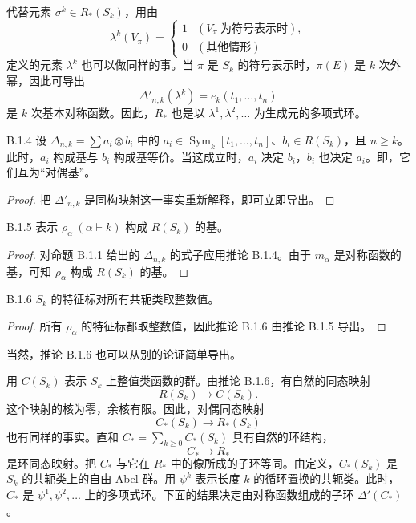 代替元素 $\sigma^k\in R_*(S_k)$，用由
\[
  \lambda^k(V_\pi)=
  \begin{cases}
    1 & (V_\pi\ \text{为符号表示时}),\\
    0 & (\text{其他情形})
  \end{cases}
\]
定义的元素 $\lambda^k$ 也可以做同样的事。当 $\pi$ 是 $S_k$ 的符号表示时，$\pi(E)$ 是 $k$ 次外幂，因此可导出
\[
  \Delta'_{n,k}(\lambda^k) = e_k(t_1,\ldots,t_n)
\]
是 $k$ 次基本对称函数。因此，$R_*$ 也是以 $\lambda^1,\lambda^2,\ldots$ 为生成元的多项式环。

\begin{corollary*}{B.1.4}
  设 $\Delta_{n,k}=\sum a_i\otimes b_i$ 中的 $a_i\in\operatorname{Sym}_k[t_1,\ldots,t_n]$、$b_i\in R(S_k)$，且 $n\ge k$。此时，$a_i$ 构成基与 $b_i$ 构成基等价。当这成立时，$a_i$ 决定 $b_i$，$b_i$ 也决定 $a_i$。即，它们互为“对偶基”。
\end{corollary*}

\begin{proof}
  把 $\Delta'_{n,k}$ 是同构映射这一事实重新解释，即可立即导出。
\end{proof}

\begin{corollary*}{B.1.5}
  表示 $\rho_\alpha\ (\alpha\vdash k)$ 构成 $R(S_k)$ 的基。
\end{corollary*}

\begin{proof}
  对命题 B.1.1 给出的 $\Delta_{n,k}$ 的式子应用推论 B.1.4。由于 $m_\alpha$ 是对称函数的基，可知 $\rho_\alpha$ 构成 $R(S_k)$ 的基。
\end{proof}

\begin{corollary*}{B.1.6}
  $S_k$ 的特征标对所有共轭类取整数值。
\end{corollary*}

\begin{proof}
  所有 $\rho_\alpha$ 的特征标都取整数值，因此推论 B.1.6 由推论 B.1.5 导出。
\end{proof}

当然，推论 B.1.6 也可以从别的论证简单导出。

用 $C(S_k)$ 表示 $S_k$ 上整值类函数的群。由推论 B.1.6，有自然的同态映射
\[
  R(S_k)\longrightarrow C(S_k).
\]
这个映射的核为零，余核有限。因此，对偶同态映射
\[
  C_*(S_k)\longrightarrow R_*(S_k)
\]
也有同样的事实。直和 $C_*=\sum_{k\ge 0}C_*(S_k)$ 具有自然的环结构，
\[
  C_*\longrightarrow R_*
\]
是环同态映射。把 $C_*$ 与它在 $R_*$ 中的像所成的子环等同。由定义，$C_*(S_k)$ 是 $S_k$ 的共轭类上的自由 Abel 群。用 $\psi^k$ 表示长度 $k$ 的循环置换的共轭类。此时，$C_*$ 是 $\psi^1,\psi^2,\ldots$ 上的多项式环。下面的结果决定由对称函数组成的子环 $\Delta'(C_*)$。

